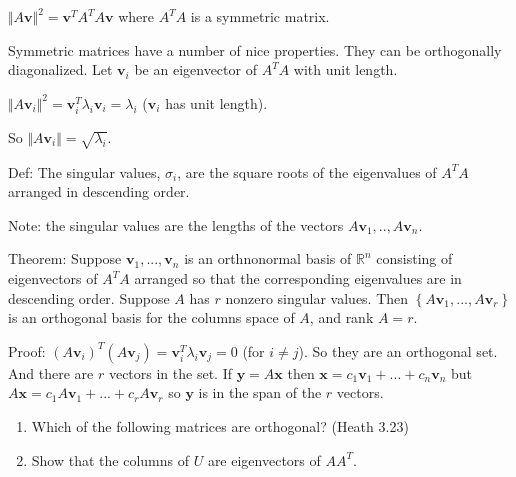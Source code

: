 \documentclass[12pt,letterpaper,noanswers]{exam}
\begin{document}
$\Vert A\mathbf{v}\Vert^2 = \mathbf{v}^TA^TA\mathbf{v}$ where $A^TA$ is a symmetric matrix.

Symmetric matrices have a number of nice properties.  They can be orthogonally diagonalized.  Let $\mathbf{v}_i$ be an eigenvector of $A^TA$ with unit length.

$\Vert A\mathbf{v}_i\Vert^2 = \mathbf{v}_i^T\lambda_i\mathbf{v}_i = \lambda_i$ ($\mathbf{v}_i$ has unit length).

So $\Vert A\mathbf{v}_i\Vert = \sqrt{\lambda_i}$.  

Def: The singular values, $\sigma_i$, are the square roots of the eigenvalues of $A^TA$ arranged in descending order.  

Note: the singular values are the lengths of the vectors $A\mathbf{v}_1,..,A\mathbf{v}_n$.

Theorem: Suppose $\mathbf{v}_1,...,\mathbf{v}_n$ is an orthnonormal basis of $\mathbb{R}^n$ consisting of eigenvectors of $A^TA$ arranged so that the corresponding eigenvalues are in descending order.  Suppose $A$ has $r$ nonzero singular values.  Then $\left\{A\mathbf{v}_1,...,A\mathbf{v}_r\right\}$ is an orthogonal basis for the columns space of $A$, and rank $A= r$.

Proof: $(A\mathbf{v}_i)^T(A\mathbf{v}_j) = \mathbf{v}_i^T\lambda_i\mathbf{v}_j = 0$ (for $i\neq j$).  So they are an orthogonal set.  And there are $r$ vectors in the set.  If $\mathbf{y} = A\mathbf{x}$ then $\mathbf{x} = c_1\mathbf{v}_1 + ... +c_n\mathbf{v}_n$ but $A\mathbf{x} = c_1A\mathbf{v}_1 + ... + c_r A\mathbf{v}_r$ so $\mathbf{y}$ is in the span of the $r$ vectors.

\begin{enumerate}
\item Which of the following matrices are orthogonal? (Heath 3.23)

\item Show that the columns of $U$ are eigenvectors of $AA^T$.
\end{enumerate}
\end{document}
